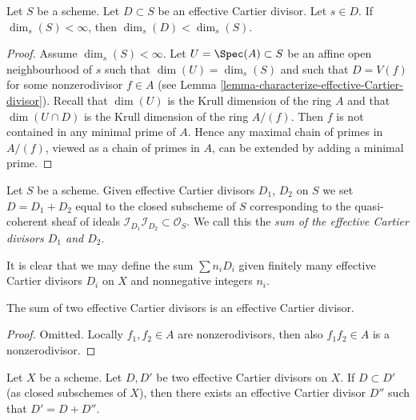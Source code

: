 \begin{lemma}
\label{lemma-effective-Cartier-makes-dimension-drop}
Let $S$ be a scheme.
Let $D \subset S$ be an effective Cartier divisor.
Let $s \in D$.
If $\dim_s(S) < \infty$, then $\dim_s(D) < \dim_s(S)$.
\end{lemma}

\begin{proof}
Assume $\dim_s(S) < \infty$.
Let $U = \Spec(A) \subset S$ be an affine open neighbourhood
of $s$ such that $\dim(U) = \dim_s(S)$ and such that $D = V(f)$
for some nonzerodivisor $f \in A$ (see
Lemma \ref{lemma-characterize-effective-Cartier-divisor}).
Recall that $\dim(U)$ is the Krull dimension of the ring $A$
and that $\dim(U \cap D)$ is the Krull dimension of the ring $A/(f)$.
Then $f$ is not contained in any minimal prime of $A$.
Hence any maximal chain of primes in $A/(f)$, viewed as a chain
of primes in $A$, can be extended by adding a minimal prime.
\end{proof}

\begin{definition}
\label{definition-sum-effective-Cartier-divisors}
Let $S$ be a scheme. Given effective Cartier divisors
$D_1$, $D_2$ on $S$ we set $D = D_1 + D_2$ equal to the
closed subscheme of $S$ corresponding to the quasi-coherent
sheaf of ideals
$\mathcal{I}_{D_1}\mathcal{I}_{D_2} \subset \mathcal{O}_S$.
We call this the {\it sum of the effective Cartier divisors
$D_1$ and $D_2$}.
\end{definition}

\noindent
It is clear that we may define the sum $\sum n_iD_i$ given
finitely many effective Cartier divisors $D_i$ on $X$
and nonnegative integers $n_i$.

\begin{lemma}
\label{lemma-sum-effective-Cartier-divisors}
The sum of two effective Cartier divisors is an effective
Cartier divisor.
\end{lemma}

\begin{proof}
Omitted. Locally $f_1, f_2 \in A$ are nonzerodivisors, then also
$f_1f_2 \in A$ is a nonzerodivisor.
\end{proof}

\begin{lemma}
\label{lemma-difference-effective-Cartier-divisors}
Let $X$ be a scheme.
Let $D, D'$ be two effective Cartier divisors on $X$.
If $D \subset D'$ (as closed subschemes of $X$), then
there exists an effective Cartier divisor $D''$ such
that $D' = D + D''$.
\end{lemma}

